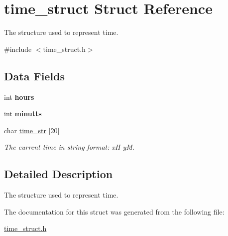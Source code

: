 \hypertarget{structtime__struct}{\section{time\-\_\-struct Struct Reference}
\label{structtime__struct}
}


The structure used to represent time.  




{\ttfamily \#include $<$time\-\_\-struct.\-h$>$}

\subsection*{Data Fields}
{\bf }\par
\begin{DoxyCompactItemize}
\item 
\hypertarget{structtime__struct_a62acd4659ffda0bc4018fa1210d389f8}{int {\bfseries hours}}\label{structtime__struct_a62acd4659ffda0bc4018fa1210d389f8}

\item 
\hypertarget{structtime__struct_a4d1c0a39521a4ec93c1fde59fbf418fc}{int {\bfseries minutts}}\label{structtime__struct_a4d1c0a39521a4ec93c1fde59fbf418fc}

\item 
\hypertarget{structtime__struct_a8535f80a2f0b1072906d2b62db10220d}{char \hyperlink{structtime__struct_a8535f80a2f0b1072906d2b62db10220d}{time\-\_\-str} \mbox{[}20\mbox{]}}\label{structtime__struct_a8535f80a2f0b1072906d2b62db10220d}

\begin{DoxyCompactList}\small\item\em The current time in string format\-: x\-H y\-M. \end{DoxyCompactList}\end{DoxyCompactItemize}



\subsection{Detailed Description}
The structure used to represent time. 

The documentation for this struct was generated from the following file\-:\begin{DoxyCompactItemize}
\item 
\hyperlink{time__struct_8h}{time\-\_\-struct.\-h}\end{DoxyCompactItemize}
